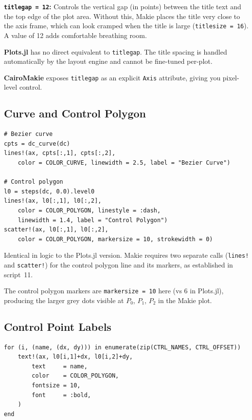 \documentclass[12pt, a4paper]{article}
\newcommand{\cd}[1]{\texttt{#1}}
\begin{document}
\textbf{\cd{titlegap = 12}:}
Controls the vertical gap (in points) between the title
text and the top edge of the plot area.
Without this, Makie places the title very close to the
axis frame, which can look cramped when the title is
large (\cd{titlesize = 16}).
A value of 12 adds comfortable breathing room.

\begin{diffbox}
\textbf{Plots.jl} has no direct equivalent to \cd{titlegap}.
The title spacing is handled automatically by the layout engine
and cannot be fine-tuned per-plot.

\textbf{CairoMakie} exposes \cd{titlegap} as an explicit
\cd{Axis} attribute, giving you pixel-level control.
\end{diffbox}

\subsection{Curve and Control Polygon}

\begin{verbatim}
# Bezier curve
cpts = dc_curve(dc)
lines!(ax, cpts[:,1], cpts[:,2],
    color = COLOR_CURVE, linewidth = 2.5, label = "Bezier Curve")

# Control polygon
l0 = steps(dc, 0.0).level0
lines!(ax, l0[:,1], l0[:,2],
    color = COLOR_POLYGON, linestyle = :dash,
    linewidth = 1.4, label = "Control Polygon")
scatter!(ax, l0[:,1], l0[:,2],
    color = COLOR_POLYGON, markersize = 10, strokewidth = 0)
\end{verbatim}

Identical in logic to the Plots.jl version.
Makie requires two separate calls (\cd{lines!} and
\cd{scatter!}) for the control polygon line and its
markers, as established in script~11.

The control polygon markers are \cd{markersize = 10}
here (vs 6 in Plots.jl), producing the larger grey
dots visible at $P_0$, $P_1$, $P_2$ in the Makie plot.

\subsection{Control Point Labels}

\begin{verbatim}
for (i, (name, (dx, dy))) in enumerate(zip(CTRL_NAMES, CTRL_OFFSET))
    text!(ax, l0[i,1]+dx, l0[i,2]+dy,
        text     = name,
        color    = COLOR_POLYGON,
        fontsize = 10,
        font     = :bold,
    )
end
\end{verbatim}
\end{document}
